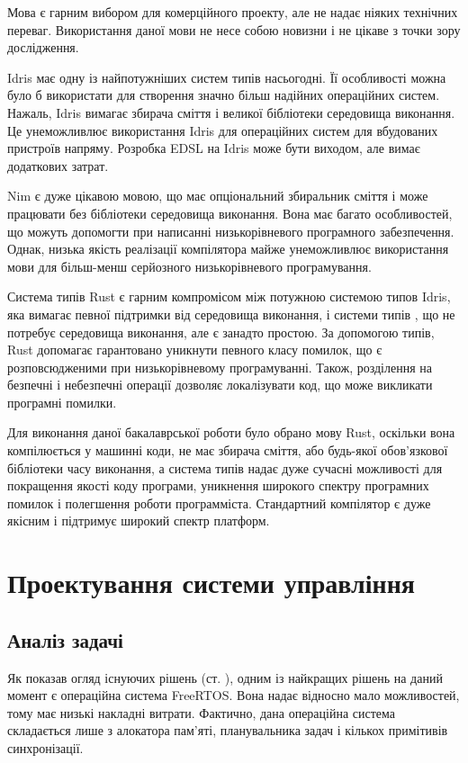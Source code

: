 \documentclass[main.tex]{subfiles}
\begin{document}
Мова \LangC{} є гарним вибором для комерційного проекту, але не надає ніяких технічних переваг. Використання даної мови не несе собою новизни і не цікаве з точки зору дослідження.

Idris має одну із найпотужніших систем типів насьогодні. Її особливості можна було б використати для створення значно більш надійних операційних систем. Нажаль, Idris вимагає збирача сміття і великої бібліотеки середовища виконання. Це унеможливлює використання Idris для операційних систем для вбудованих пристроїв напряму. Розробка EDSL на Idris може бути виходом, але вимає додаткових затрат.

Nim є дуже цікавою мовою, що має опціональний збиральник сміття і може працювати без бібліотеки середовища виконання. Вона має багато особливостей, що можуть допомогти при написанні низькорівневого програмного забезпечення. Однак, низька якість реалізації компілятора майже унеможливлює використання мови для більш-менш серйозного низькорівневого програмування.

Система типів Rust є гарним компромісом між потужною системою типов Idris, яка вимагає певної підтримки від середовища виконання, і системи типів \LangC{}, що не потребує середовища виконання, але є занадто простою. За допомогою типів, Rust допомагає гарантовано уникнути певного класу помилок, що є розповсюдженими при низькорівневому програмуванні. Також, розділення на безпечні і небезпечні операції дозволяє локалізувати код, що може викликати програмні помилки.

Для виконання даної бакалаврської роботи було обрано мову Rust, оскільки вона компілюється у машинні коди, не має збирача сміття, або будь-якої обов'язкової бібліотеки часу виконання, а система типів надає дуже сучасні можливості для покращення якості коду програми, уникнення широкого спектру програмних помилок і полегшення роботи программіста. Стандартний компілятор є дуже якісним і підтримує широкий спектр платформ.

\chapter{Проектування системи управління}
\section{Аналіз задачі}

Як показав огляд існуючих рішень (ст. \pageref{existing-solutions}), одним із найкращих рішень на даний момент є операційна система FreeRTOS. Вона надає відносно мало можливостей, тому має низькі накладні витрати. Фактично, дана операційна система складається лише з алокатора пам'яті, планувальника задач і кількох примітивів синхронізації.
\end{document}

